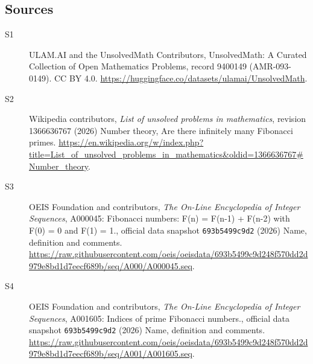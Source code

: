 \documentclass[11pt]{article}
\begin{document}
\subsection{Sources}
\begin{description}
\item[\hypertarget{source:9400149:1}{S1}] ULAM.AI and the UnsolvedMath Contributors, UnsolvedMath: A Curated Collection of Open Mathematics Problems, record 9400149 (AMR-093-0149). CC BY 4.0. \url{https://huggingface.co/datasets/ulamai/UnsolvedMath}.
\item[\hypertarget{source:9400149:2}{S2}] Wikipedia contributors, \emph{List of unsolved problems in mathematics}, revision 1366636767 (2026) Number theory, Are there infinitely many Fibonacci primes. \url{https://en.wikipedia.org/w/index.php?title=List_of_unsolved_problems_in_mathematics&oldid=1366636767#Number_theory}.
\item[\hypertarget{source:9400149:3}{S3}] OEIS Foundation and contributors, \emph{The On-Line Encyclopedia of Integer Sequences}, A000045: Fibonacci numbers: F(n) = F(n-1) + F(n-2) with F(0) = 0 and F(1) = 1., official data snapshot \texttt{693b5499c9d2} (2026) Name, definition and comments. \url{https://raw.githubusercontent.com/oeis/oeisdata/693b5499c9d248f570dd2d979e8bd1d7eecf689b/seq/A000/A000045.seq}.
\item[\hypertarget{source:9400149:4}{S4}] OEIS Foundation and contributors, \emph{The On-Line Encyclopedia of Integer Sequences}, A001605: Indices of prime Fibonacci numbers., official data snapshot \texttt{693b5499c9d2} (2026) Name, definition and comments. \url{https://raw.githubusercontent.com/oeis/oeisdata/693b5499c9d248f570dd2d979e8bd1d7eecf689b/seq/A001/A001605.seq}.
\end{description}
\label{end:9400149}
\end{document}

